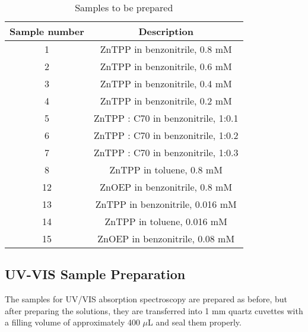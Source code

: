 \begin{table}[ht]
    \centering
    \begin{tabular}{c|c}
        \toprule
        Sample number & Description \\
        \midrule
        1 & ZnTPP in benzonitrile, 0.8 mM \\
        2 & ZnTPP in benzonitrile, 0.6 mM \\
        3 & ZnTPP in benzonitrile, 0.4 mM \\
        4 & ZnTPP in benzonitrile, 0.2 mM \\
        5 & ZnTPP : C70 in benzonitrile, 1:0.1 \\
        6 & ZnTPP : C70 in benzonitrile, 1:0.2 \\
        7 & ZnTPP : C70 in benzonitrile, 1:0.3 \\
        8 & ZnTPP in toluene, 0.8 mM \\
        12 & ZnOEP in benzonitrile, 0.8 mM \\
        13 & ZnTPP in benzonitrile, 0.016 mM \\
        14 & ZnTPP in toluene, 0.016 mM \\
        15 & ZnOEP in benzonitrile, 0.08 mM \\
        \bottomrule
    \end{tabular}
    \caption{Samples to be prepared}
    \label{tab:sample}
\end{table}

\subsection*{UV-VIS Sample Preparation}

The samples for UV/VIS absorption spectroscopy are prepared as before, but after preparing the solutions, they are 
transferred into 1 mm quartz cuvettes with a filling volume of approximately 400 $\mu$L and seal them properly.


